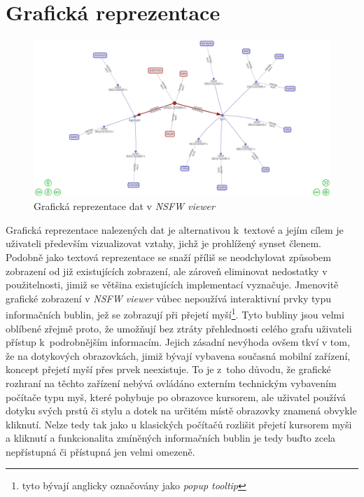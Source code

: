 \documentclass[a4paper, 11pt, oneside, showtrims]{book}
\newcommand{\simplywn}{\textit{NSFW viewer} }
\begin{document}
			\section{Grafická reprezentace}
			\label{cha:graphui}

				\begin{figure}[h]
					\centering
					\includegraphics[width=1.0\textwidth]{simplywn_graph.png}
					\caption{Grafická reprezentace dat v \simplywn}
					\label{fig:simplywn_graph}
				\end{figure}

				Grafická reprezentace nalezených dat je alternativou k~textové a jejím cílem je uživateli především vizualizovat vztahy, jichž je prohlížený synset členem. Podobně jako textová reprezentace se snaží příliš se neodchylovat způsobem zobrazení od již existujících zobrazení, ale zároveň eliminovat nedostatky v použitelnosti, jimiž se většina existujících implementací vyznačuje. Jmenovitě grafické zobrazení v \simplywn vůbec nepoužívá interaktivní prvky typu informačních bublin, jež se zobrazují při přejetí myší\footnote{tyto bývají anglicky označovány jako \textit{popup tooltip}}. Tyto bubliny jsou velmi oblíbené zřejmě proto, že umožňují bez ztráty přehlednosti celého grafu uživateli přístup k~podrobnějším informacím. Jejich zásadní nevýhoda ovšem tkví v tom, že na dotykových obrazovkách, jimiž bývají vybavena současná mobilní zařízení, koncept přejetí myší přes prvek neexistuje. To je z~toho důvodu, že grafické rozhraní na těchto zařízení nebývá ovládáno externím technickým vybavením počítače typu myš, které pohybuje po obrazovce kursorem, ale uživatel používá dotyku svých prstů či stylu a dotek na určitém místě obrazovky znamená obvykle kliknutí. Nelze tedy tak jako u klasických počítačů rozlišit přejetí kursorem myši a kliknutí a funkcionalita zmíněných informačních bublin je tedy buďto zcela nepřístupná či přístupná jen velmi omezeně. 
\end{document}
